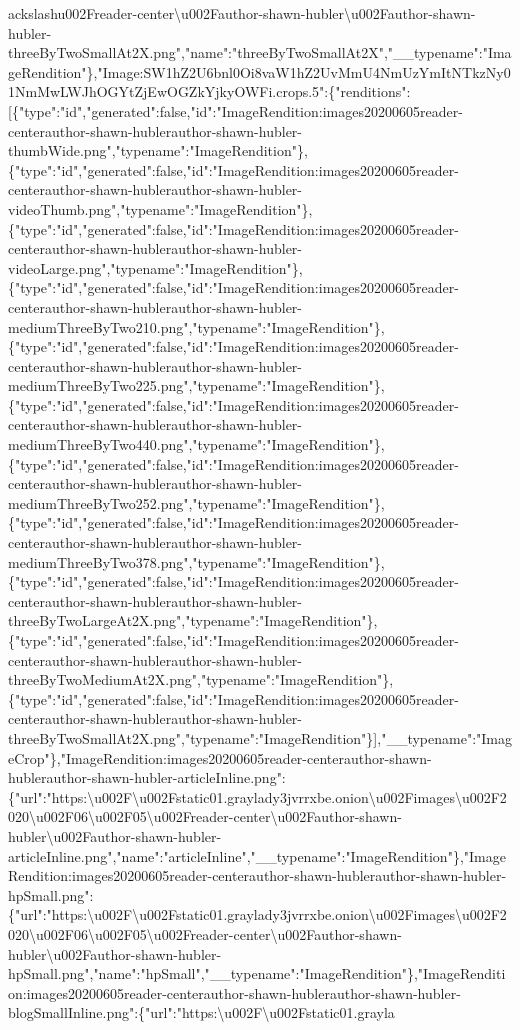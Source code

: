 ackslash{}u002Freader-center\textbackslash{}u002Fauthor-shawn-hubler\textbackslash{}u002Fauthor-shawn-hubler-threeByTwoSmallAt2X.png","name":"threeByTwoSmallAt2X","\_\_typename":"ImageRendition"\},"Image:SW1hZ2U6bnl0Oi8vaW1hZ2UvMmU4NmUzYmItNTkzNy01NmMwLWJhOGYtZjEwOGZkYjkyOWFi.crops.5":\{"renditions":{[}\{"type":"id","generated":false,"id":"ImageRendition:images20200605reader-centerauthor-shawn-hublerauthor-shawn-hubler-thumbWide.png","typename":"ImageRendition"\},\{"type":"id","generated":false,"id":"ImageRendition:images20200605reader-centerauthor-shawn-hublerauthor-shawn-hubler-videoThumb.png","typename":"ImageRendition"\},\{"type":"id","generated":false,"id":"ImageRendition:images20200605reader-centerauthor-shawn-hublerauthor-shawn-hubler-videoLarge.png","typename":"ImageRendition"\},\{"type":"id","generated":false,"id":"ImageRendition:images20200605reader-centerauthor-shawn-hublerauthor-shawn-hubler-mediumThreeByTwo210.png","typename":"ImageRendition"\},\{"type":"id","generated":false,"id":"ImageRendition:images20200605reader-centerauthor-shawn-hublerauthor-shawn-hubler-mediumThreeByTwo225.png","typename":"ImageRendition"\},\{"type":"id","generated":false,"id":"ImageRendition:images20200605reader-centerauthor-shawn-hublerauthor-shawn-hubler-mediumThreeByTwo440.png","typename":"ImageRendition"\},\{"type":"id","generated":false,"id":"ImageRendition:images20200605reader-centerauthor-shawn-hublerauthor-shawn-hubler-mediumThreeByTwo252.png","typename":"ImageRendition"\},\{"type":"id","generated":false,"id":"ImageRendition:images20200605reader-centerauthor-shawn-hublerauthor-shawn-hubler-mediumThreeByTwo378.png","typename":"ImageRendition"\},\{"type":"id","generated":false,"id":"ImageRendition:images20200605reader-centerauthor-shawn-hublerauthor-shawn-hubler-threeByTwoLargeAt2X.png","typename":"ImageRendition"\},\{"type":"id","generated":false,"id":"ImageRendition:images20200605reader-centerauthor-shawn-hublerauthor-shawn-hubler-threeByTwoMediumAt2X.png","typename":"ImageRendition"\},\{"type":"id","generated":false,"id":"ImageRendition:images20200605reader-centerauthor-shawn-hublerauthor-shawn-hubler-threeByTwoSmallAt2X.png","typename":"ImageRendition"\}{]},"\_\_typename":"ImageCrop"\},"ImageRendition:images20200605reader-centerauthor-shawn-hublerauthor-shawn-hubler-articleInline.png":\{"url":"https:\textbackslash{}u002F\textbackslash{}u002Fstatic01.graylady3jvrrxbe.onion\textbackslash{}u002Fimages\textbackslash{}u002F2020\textbackslash{}u002F06\textbackslash{}u002F05\textbackslash{}u002Freader-center\textbackslash{}u002Fauthor-shawn-hubler\textbackslash{}u002Fauthor-shawn-hubler-articleInline.png","name":"articleInline","\_\_typename":"ImageRendition"\},"ImageRendition:images20200605reader-centerauthor-shawn-hublerauthor-shawn-hubler-hpSmall.png":\{"url":"https:\textbackslash{}u002F\textbackslash{}u002Fstatic01.graylady3jvrrxbe.onion\textbackslash{}u002Fimages\textbackslash{}u002F2020\textbackslash{}u002F06\textbackslash{}u002F05\textbackslash{}u002Freader-center\textbackslash{}u002Fauthor-shawn-hubler\textbackslash{}u002Fauthor-shawn-hubler-hpSmall.png","name":"hpSmall","\_\_typename":"ImageRendition"\},"ImageRendition:images20200605reader-centerauthor-shawn-hublerauthor-shawn-hubler-blogSmallInline.png":\{"url":"https:\textbackslash{}u002F\textbackslash{}u002Fstatic01.grayla